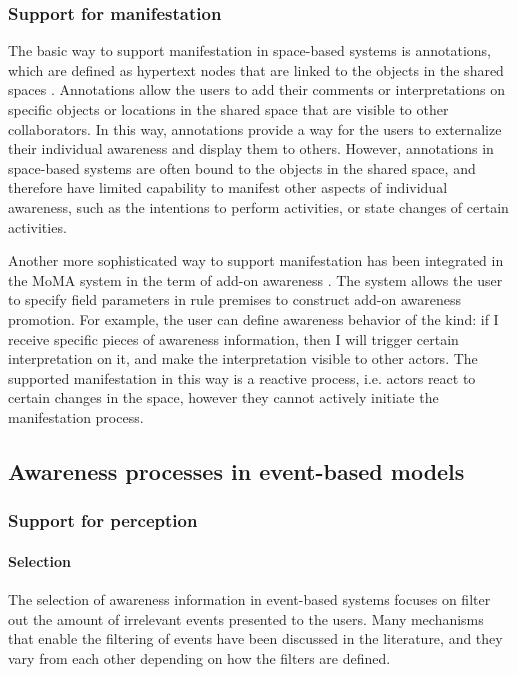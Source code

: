 \subsubsection{Support for manifestation} %
\label{ssub:support_for_manifestation}
The basic way to support manifestation in space-based systems is annotations, which are defined as hypertext nodes that are linked to the objects in the shared spaces \cite{Zheng2006,Weng2004}. Annotations allow the users to add their comments or interpretations on specific objects or locations in the shared space that are visible to other collaborators. In this way, annotations provide a way for the users to externalize their individual awareness and display them to others. However, annotations in space-based systems are often bound to the objects in the shared space, and therefore have limited capability to manifest other aspects of individual awareness, such as the intentions to perform activities, or state changes of certain activities. 

Another more sophisticated way to support manifestation has been integrated in the MoMA system in the term of add-on awareness \cite{simone2002a}. The system allows the user to specify field parameters in rule premises to construct add-on awareness promotion. For example, the user can define awareness behavior of the kind: if I receive specific pieces of awareness information, then I will trigger certain interpretation on it, and make the interpretation visible to other actors. The supported manifestation in this way is a reactive process, i.e. actors react to certain changes in the space, however they cannot actively initiate the manifestation process.


\subsection{Awareness processes in event-based models} %
\label{sub:awareness_processes_in_event_based_models}
\subsubsection{Support for perception} %
\label{ssub:support_for_perception}

\paragraph*{Selection} %
\label{par:selection}
The selection of awareness information in event-based systems focuses on filter out the amount of irrelevant events presented to the users. Many mechanisms that enable the filtering of events have been discussed in the literature, and they vary from each other depending on how the filters are defined. 

